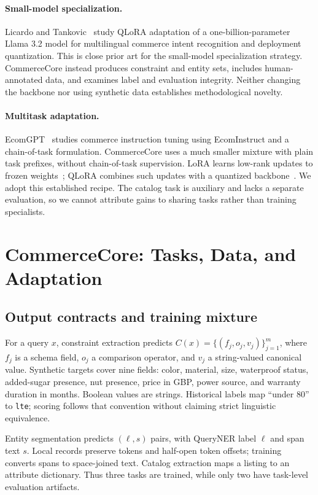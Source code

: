\documentclass{article}
\newcommand{\code}[1]{\texttt{#1}}
\begin{document}
\paragraph{Small-model specialization.}
Licardo and Tankovic~\cite{licardo2025} study QLoRA adaptation of a one-billion-parameter Llama 3.2 model for multilingual commerce intent recognition and deployment quantization. This is close prior art for the small-model specialization strategy. CommerceCore instead produces constraint and entity sets, includes human-annotated data, and examines label and evaluation integrity. Neither changing the backbone nor using synthetic data establishes methodological novelty.

\paragraph{Multitask adaptation.}
EcomGPT~\cite{ecomgpt} studies commerce instruction tuning using EcomInstruct and a chain-of-task formulation. CommerceCore uses a much smaller mixture with plain task prefixes, without chain-of-task supervision. LoRA learns low-rank updates to frozen weights~\cite{lora}; QLoRA combines such updates with a quantized backbone~\cite{qlora}. We adopt this established recipe. The catalog task is auxiliary and lacks a separate evaluation, so we cannot attribute gains to sharing tasks rather than training specialists.

\section{CommerceCore: Tasks, Data, and Adaptation}
\label{sec:method}
\subsection{Output contracts and training mixture}
For a query $x$, constraint extraction predicts $C(x)=\{(f_j,o_j,v_j)\}_{j=1}^{m}$, where $f_j$ is a schema field, $o_j$ a comparison operator, and $v_j$ a string-valued canonical value. Synthetic targets cover nine fields: color, material, size, waterproof status, added-sugar presence, nut presence, price in GBP, power source, and warranty duration in months. Boolean values are strings. Historical labels map ``under 80'' to \code{lte}; scoring follows that convention without claiming strict linguistic equivalence.

Entity segmentation predicts $(\ell,s)$ pairs, with QueryNER label $\ell$ and span text $s$. Local records preserve tokens and half-open token offsets; training converts spans to space-joined text. Catalog extraction maps a listing to an attribute dictionary. Thus three tasks are trained, while only two have task-level evaluation artifacts.
\end{document}
